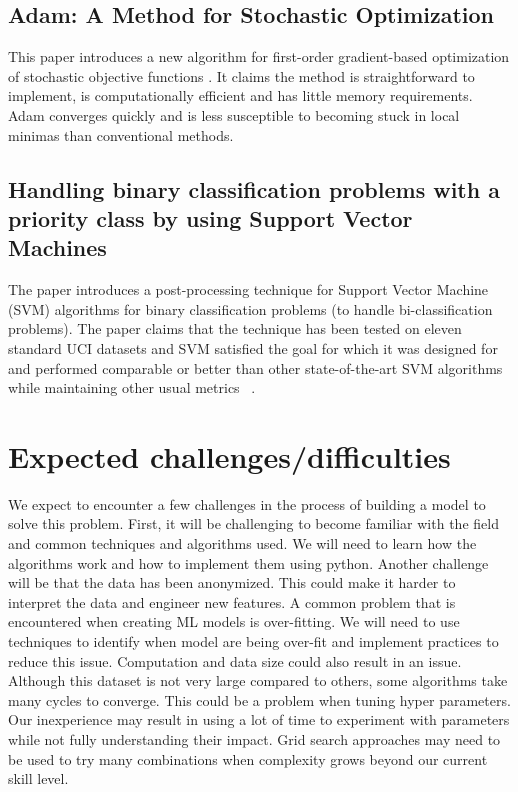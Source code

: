 \documentclass{llncs}
\begin{document}
\subsection{Adam: A Method for Stochastic Optimization}
This paper introduces a new algorithm for first-order gradient-based optimization of stochastic objective functions \cite{ref_article2}. It claims the method is straightforward to implement, is computationally efficient and has little memory requirements. Adam converges quickly and is less susceptible to becoming stuck in local minimas than conventional methods.


\subsection{Handling binary classification problems with a priority class by using Support Vector Machines}
The paper introduces a post-processing technique for Support Vector Machine (SVM) algorithms for binary classification problems (to handle bi-classification problems). The paper claims that the technique has been tested on eleven standard UCI datasets and SVM satisfied the goal for which it was designed for and performed comparable or better than other state-of-the-art SVM algorithms while maintaining other usual metrics ~\cite{ref_article4}.

\section{Expected challenges/difficulties}
We expect to encounter a few challenges in the process of building a model to solve this problem. First, it will be challenging to become familiar with the field and common techniques and algorithms used. We will need to learn how the algorithms work and how to implement them using python. Another challenge will be that the data has been anonymized. This could make it harder to interpret the data and engineer new features. A common problem that is encountered when creating ML models is over-fitting. We will need to use techniques to identify when model are being over-fit and implement practices to reduce this issue. Computation and data size could also result in an issue. Although this dataset is not very large compared to others, some algorithms take many cycles to converge. This could be a problem when tuning hyper parameters. Our inexperience may result in using a lot of time to experiment with parameters while not fully understanding their impact. Grid search approaches may need to be used to try many combinations when complexity grows beyond our current skill level.
\end{document}
